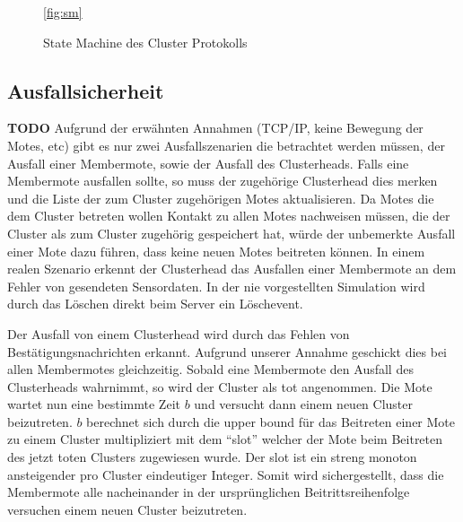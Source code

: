 \begin{figure}
\ref{fig:sm}
\caption{State Machine des Cluster Protokolls}
\end{figure}
\subsection{Ausfallsicherheit} \textbf{TODO}
Aufgrund der erw\"ahnten Annahmen (TCP/IP, keine Bewegung der Motes, etc) gibt es nur zwei Ausfallszenarien die betrachtet werden m\"ussen, der Ausfall einer Membermote,  sowie der Ausfall des Clusterheads.
Falls eine Membermote ausfallen sollte, so muss der zugeh\"orige Clusterhead dies merken und die Liste der zum Cluster zugeh\"origen Motes aktualisieren.
Da Motes die dem Cluster betreten wollen Kontakt zu allen Motes nachweisen m\"ussen, die der Cluster als zum Cluster zugeh\"orig gespeichert hat, w\"urde der unbemerkte Ausfall einer Mote dazu f\"uhren, dass keine neuen Motes beitreten k\"onnen.
In einem realen Szenario erkennt der Clusterhead das Ausfallen einer Membermote an dem Fehler von gesendeten Sensordaten. In der nie vorgestellten Simulation wird durch das L\"oschen direkt beim Server ein L\"oschevent.

Der Ausfall von einem Clusterhead wird durch das Fehlen von Best\"atigungsnachrichten erkannt.
Aufgrund unserer Annahme geschickt dies bei allen Membermotes gleichzeitig.
Sobald eine Membermote den Ausfall des Clusterheads wahrnimmt, so wird der Cluster als tot angenommen.
Die Mote wartet nun eine bestimmte Zeit $b$ und versucht dann einem neuen Cluster beizutreten.
$b$ berechnet sich durch die upper bound f\"ur das Beitreten einer Mote zu einem Cluster multipliziert mit dem ``slot'' welcher der Mote beim Beitreten des jetzt toten Clusters zugewiesen wurde.
Der slot ist ein streng monoton ansteigender pro Cluster eindeutiger Integer.
Somit wird sichergestellt, dass die Membermote alle nacheinander in der urspr\"unglichen Beitrittsreihenfolge versuchen einem neuen Cluster beizutreten.

